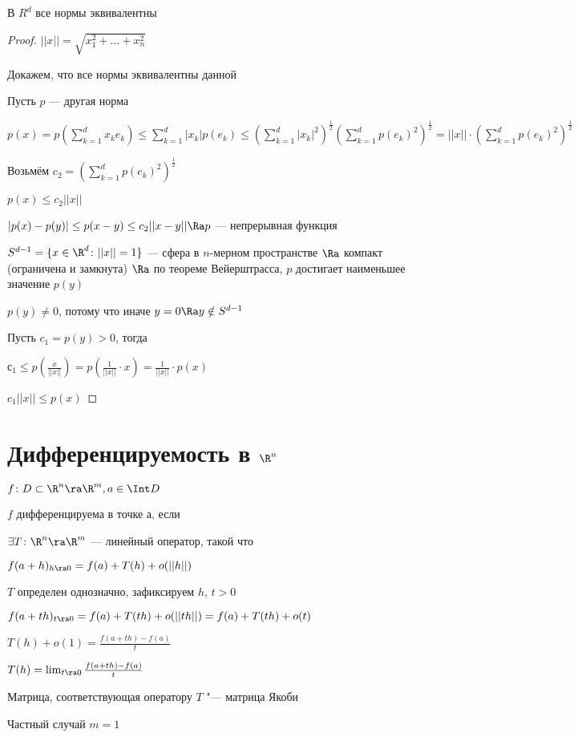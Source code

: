 \begin{theorem}
В  $R^d$ все нормы эквивалентны
\end{theorem}

\begin{proof}
$||x|| = \sqrt{x_1^2 + \dots + x_n^2}$

Докажем, что все нормы эквивалентны данной

Пусть $p$ --- другая норма

$p(x) = p(\sum_{k = 1}^d x_k e_k) \le \sum_{k = 1}^d |x_k| p(e_k) \le (\sum_{k = 1}^d |x_k|^2)^{\frac{1}{2}} (\sum_{k = 1}^d p(e_k)^2)^{\frac{1}{2}} = ||x|| \cdot (\sum_{k = 1}^d p(e_k)^2)^{\frac{1}{2}}$

Возьмём $c_2 = (\sum_{k = 1}^d p(e_k)^2)^{\frac{1}{2}}$

$p(x) \le c_2 ||x||$

$|p(x) - p(y)| \le p(x - y) \le c_2 ||x - y|| \Ra p$ --- непрерывная функция

$S^{d - 1} = \{x\in \R^d \colon ||x|| = 1\}$ --- сфера в $n$-мерном пространстве $\Ra$ компакт (ограничена и замкнута) $\Ra$ по теореме Вейерштрасса, $p$ достигает наименьшее значение $p(y)$

$p(y) \neq 0$, потому что иначе $y = 0 \Ra y \notin S^{d - 1}$

Пусть $c_1 = p(y) > 0$, тогда

$с_1 \le p(\frac{x}{||x||}) = p(\frac{1}{||x||} \cdot x) = \frac{1}{||x||} \cdot p(x)$

$c_1||x|| \le p(x)$
\end{proof}

\section{Дифференцируемость в $\R^n$}

\begin{Def}
$f \colon D \subset \R^n \ra \R^m, a \in \Int D$

$f$ дифференцируема в точке а, если

$\exists T \colon \R^n \ra \R^m$ --- линейный оператор, такой что

$f(a + h)_{h \ra 0} = f(a) + T(h) + o(||h||)$
\end{Def}
\begin{Rem}
$T$ определен однозначно, зафиксируем $h$, $t > 0$

$f(a + th)_{t \ra 0} = f(a) + T(th) + o(||th||) = f(a) + T(th) + o(t)$

$T(h) + o(1) = \frac{f(a + th) - f(a)}{t}$

$T(h) = \lim_{t \ra 0} \frac{f(a + th) - f(a)}{t}$
\end{Rem}
\begin{Def}
Матрица, соответствующая оператору $T$ "--- матрица Якоби
\end{Def}
Частный случай $m = 1$


